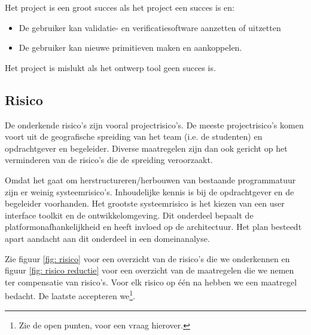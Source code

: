 Het project is een groot succes als het project een succes is en:

\begin{itemize}
 \item De gebruiker kan validatie- en verificatiesoftware aanzetten of uitzetten
 \item De gebruiker kan nieuwe primitieven maken en aankoppelen.
\end{itemize}

Het project is mislukt als het ontwerp tool geen succes is.

\subsection{Risico}

De onderkende risico's zijn vooral projectrisico's. De meeste projectrisico's komen voort uit de
geografische spreiding van het team (i.e. de studenten) en opdrachtgever
en begeleider. Diverse maatregelen zijn dan ook gericht op het verminderen
van de risico's die de spreiding veroorzaakt.


Omdat het gaat om herstructureren/herbouwen van bestaande programmatuur zijn er weinig systeemrisico's.
Inhoudelijke kennis is bij de opdrachtgever en de begeleider voorhanden. Het grootste systeemrisico is het kiezen
van een user interface toolkit en de ontwikkelomgeving. Dit onderdeel bepaalt de platformonafhankelijkheid
en heeft invloed op de architectuur. Het plan besteedt apart aandacht aan dit onderdeel in een domeinanalyse.

Zie figuur \ref{fig: risico} voor een overzicht van de risico's die we onderkennen en figuur \ref{fig: risico reductie} voor
een overzicht van de maatregelen die we nemen ter compensatie van risico's. Voor elk risico op \'e\'en na hebben we een
maatregel bedacht. De laatste accepteren we\footnote{Zie de open punten, voor een vraag hierover.}.


